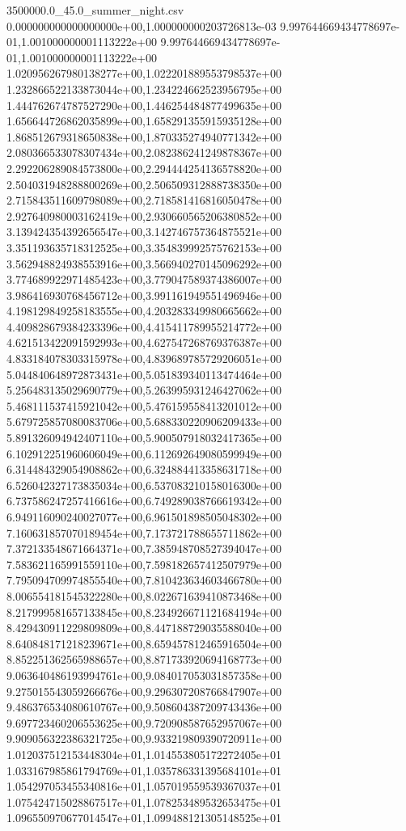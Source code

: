 \begin{filecontents*}{3500000.0_45.0_summer_night.csv}
0.000000000000000000e+00,1.000000000203726813e-03
9.997644669434778697e-01,1.001000000001113222e+00
9.997644669434778697e-01,1.001000000001113222e+00
1.020956267980138277e+00,1.022201889553798537e+00
1.232866522133873044e+00,1.234224662523956795e+00
1.444762674787527290e+00,1.446254484877499635e+00
1.656644726862035899e+00,1.658291355915935128e+00
1.868512679318650838e+00,1.870335274940771342e+00
2.080366533078307434e+00,2.082386241249878367e+00
2.292206289084573800e+00,2.294444254136578820e+00
2.504031948288800269e+00,2.506509312888738350e+00
2.715843511609798089e+00,2.718581416816050478e+00
2.927640980003162419e+00,2.930660565206380852e+00
3.139424354392656547e+00,3.142746757364875521e+00
3.351193635718312525e+00,3.354839992575762153e+00
3.562948824938553916e+00,3.566940270145096292e+00
3.774689922971485423e+00,3.779047589374386007e+00
3.986416930768456712e+00,3.991161949551496946e+00
4.198129849258183555e+00,4.203283349980665662e+00
4.409828679384233396e+00,4.415411789955214772e+00
4.621513422091592993e+00,4.627547268769376387e+00
4.833184078303315978e+00,4.839689785729206051e+00
5.044840648972873431e+00,5.051839340113474464e+00
5.256483135029690779e+00,5.263995931246427062e+00
5.468111537415921042e+00,5.476159558413201012e+00
5.679725857080083706e+00,5.688330220906209433e+00
5.891326094942407110e+00,5.900507918032417365e+00
6.102912251960606049e+00,6.112692649080599949e+00
6.314484329054908862e+00,6.324884413358631718e+00
6.526042327173835034e+00,6.537083210158016300e+00
6.737586247257416616e+00,6.749289038766619342e+00
6.949116090240027077e+00,6.961501898505048302e+00
7.160631857070189454e+00,7.173721788655711862e+00
7.372133548671664371e+00,7.385948708527394047e+00
7.583621165991559110e+00,7.598182657412507979e+00
7.795094709974855540e+00,7.810423634603466780e+00
8.006554181545322280e+00,8.022671639410873468e+00
8.217999581657133845e+00,8.234926671121684194e+00
8.429430911229809809e+00,8.447188729035588040e+00
8.640848171218239671e+00,8.659457812465916504e+00
8.852251362565988657e+00,8.871733920694168773e+00
9.063640486193994761e+00,9.084017053031857358e+00
9.275015543059266676e+00,9.296307208766847907e+00
9.486376534080610767e+00,9.508604387209743436e+00
9.697723460206553625e+00,9.720908587652957067e+00
9.909056322386321725e+00,9.933219809390720911e+00
1.012037512153448304e+01,1.014553805172272405e+01
1.033167985861794769e+01,1.035786331395684101e+01
1.054297053455340816e+01,1.057019559539367037e+01
1.075424715028867517e+01,1.078253489532653475e+01
1.096550970677014547e+01,1.099488121305148525e+01

\end{filecontents*}
